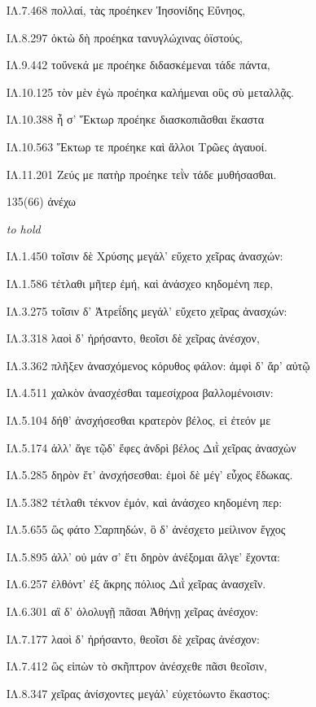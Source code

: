 \begin{enumerate}
{ΙΛ.7.468 πολλαί, τὰς προέηκεν Ἰησονίδης Εὔνηος,

ΙΛ.8.297 ὀκτὼ δὴ προέηκα τανυγλώχινας ὀϊστούς,

ΙΛ.9.442 τοὔνεκά με προέηκε διδασκέμεναι τάδε πάντα,

ΙΛ.10.125 τὸν μὲν ἐγὼ προέηκα καλήμεναι οὓς σὺ μεταλλᾷς.

ΙΛ.10.388 ἦ σ' Ἕκτωρ προέηκε διασκοπιᾶσθαι ἕκαστα

ΙΛ.10.563 Ἕκτωρ τε προέηκε καὶ ἄλλοι Τρῶες ἀγαυοί.

ΙΛ.11.201 Ζεύς με πατὴρ προέηκε τεῒν τάδε μυθήσασθαι.

}

\clearpage
\item[\large 135(66)]{\large \g ἀνέχω	}

\hspace{0.2cm} \textit{ to hold }

{\g
ΙΛ.1.450 τοῖσιν δὲ Χρύσης μεγάλ' εὔχετο χεῖρας ἀνασχών:

ΙΛ.1.586 τέτλαθι μῆτερ ἐμή, καὶ ἀνάσχεο κηδομένη περ,

ΙΛ.3.275 τοῖσιν δ' Ἀτρεΐδης μεγάλ' εὔχετο χεῖρας ἀνασχών:

ΙΛ.3.318 λαοὶ δ' ἠρήσαντο, θεοῖσι δὲ χεῖρας ἀνέσχον,

ΙΛ.3.362 πλῆξεν ἀνασχόμενος κόρυθος φάλον: ἀμφὶ δ' ἄρ' αὐτῷ

ΙΛ.4.511 χαλκὸν ἀνασχέσθαι ταμεσίχροα βαλλομένοισιν:

ΙΛ.5.104 δήθ' ἀνσχήσεσθαι κρατερὸν βέλος, εἰ ἐτεόν με

ΙΛ.5.174 ἀλλ' ἄγε τῷδ' ἔφες ἀνδρὶ βέλος Διῒ χεῖρας ἀνασχὼν

ΙΛ.5.285 δηρὸν ἔτ' ἀνσχήσεσθαι: ἐμοὶ δὲ μέγ' εὖχος ἔδωκας.

ΙΛ.5.382 τέτλαθι τέκνον ἐμόν, καὶ ἀνάσχεο κηδομένη περ:

ΙΛ.5.655 ὣς φάτο Σαρπηδών, ὃ δ' ἀνέσχετο μείλινον ἔγχος

ΙΛ.5.895 ἀλλ' οὐ μάν σ' ἔτι δηρὸν ἀνέξομαι ἄλγε' ἔχοντα:

ΙΛ.6.257 ἐλθόντ' ἐξ ἄκρης πόλιος Διῒ χεῖρας ἀνασχεῖν.

ΙΛ.6.301 αἳ δ' ὀλολυγῇ πᾶσαι Ἀθήνῃ χεῖρας ἀνέσχον:

ΙΛ.7.177 λαοὶ δ' ἠρήσαντο, θεοῖσι δὲ χεῖρας ἀνέσχον:

ΙΛ.7.412 ὣς εἰπὼν τὸ σκῆπτρον ἀνέσχεθε πᾶσι θεοῖσιν,

ΙΛ.8.347 χεῖρας ἀνίσχοντες μεγάλ' εὐχετόωντο ἕκαστος:

}
\end{enumerate}
